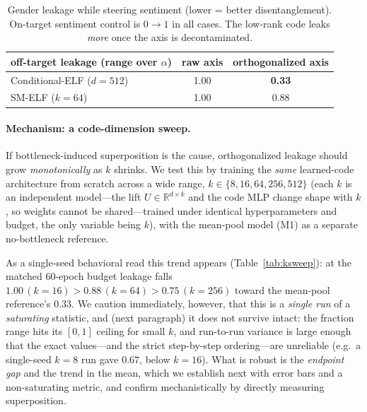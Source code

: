 \documentclass[11pt]{article}
\newcommand{\R}{\mathbb{R}}
\begin{document}
\begin{table}[h]\centering\small
\begin{tabular}{lcc}
off-target leakage (range over $\alpha$) & raw axis & orthogonalized axis \\
\hline
Conditional-ELF ($d{=}512$) & 1.00 & \textbf{0.33} \\
SM-ELF ($k{=}64$)           & 1.00 & 0.88 \\
\end{tabular}
\caption{Gender leakage while steering sentiment (lower = better disentanglement).
On-target sentiment control is $0\!\to\!1$ in all cases. The low-rank code leaks
\emph{more} once the axis is decontaminated.}
\label{tab:leak}
\end{table}

\paragraph{Mechanism: a code-dimension sweep.}
If bottleneck-induced superposition is the cause, orthogonalized leakage should
grow \emph{monotonically} as $k$ shrinks. We test this by training the
\emph{same} learned-code architecture from scratch across a wide range,
$k\in\{8,16,64,256,512\}$ (each $k$ is an independent model---the lift
$U\in\R^{d\times k}$ and the code MLP change shape with $k$, so weights cannot be
shared---trained under identical hyperparameters and budget, the only variable
being $k$), with the mean-pool model (M1) as a separate no-bottleneck reference.

As a single-seed behavioral read this trend appears (Table~\ref{tab:ksweep}): at
the matched 60-epoch budget leakage falls $1.00\,(k{=}16)>0.88\,(k{=}64)
>0.75\,(k{=}256)$ toward the mean-pool reference's $0.33$. We caution
immediately, however, that this is a \emph{single run} of a \emph{saturating}
statistic, and (next paragraph) it does not survive intact: the fraction range
hits its $[0,1]$ ceiling for small $k$, and run-to-run variance is large enough
that the exact values---and the strict step-by-step ordering---are unreliable
(e.g.\ a single-seed $k{=}8$ run gave $0.67$, below $k{=}16$). What is robust is
the \emph{endpoint gap} and the trend in the mean, which we establish next with
error bars and a non-saturating metric, and confirm mechanistically by directly
measuring superposition.
\end{document}
